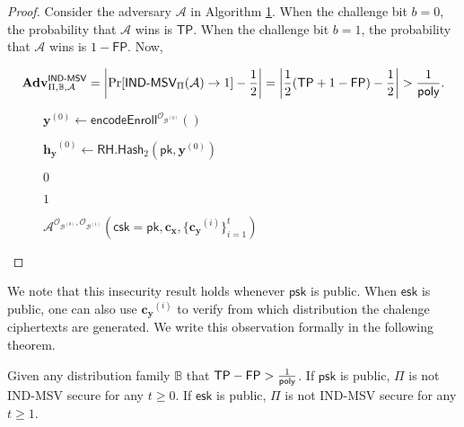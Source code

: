 \begin{proof}

Consider the adversary $\mathcal{A}$ in Algorithm \ref{alg:rh:ind}. When the challenge bit $b = 0$, the probability that $\mathcal{A}$ wins is $\textsf{TP}$. When the challenge bit $b = 1$, the probability that $\mathcal{A}$ wins is $1 - \textsf{FP}$. Now, 

\[
	\mathbf{Adv}_{\Pi, \mathbb{B}, \mathcal{A}}^{\textsf{IND-MSV}} = \left| \Pr[ \textsf{IND-MSV}_\Pi(\mathcal{A}) \to 1 ] - \frac{1}{2} \right| = \left| \frac{1}{2} (\textsf{TP} + 1 - \textsf{FP}) - \frac{1}{2} \right| > \frac{1}{\mathsf{poly}}.
\]

\begin{figure}[h]
\centering

	\begin{minipage}[t]{0.7\textwidth}
	\begin{algorithm}[H]
	\caption{$\mathcal{A}^{\mathcal{O}_{\mathcal{B}^{(0)}}, \mathcal{O}_{\mathcal{B}^{(1)}}} ( \textsf{csk} = \textsf{pk}, \mathbf{c_x}, \{ \mathbf{c_y}^{(i)} \}_{i=1}^t )$}
	\label{alg:rh:ind}
	\begin{algorithmic}[1]

		\State $\mathbf{y}^{(0)} \gets \textsf{encodeEnroll}^{\mathcal{O}_{\mathcal{B}^{(0)}}}()$
		
		\State $\mathbf{h_y}^{(0)} \gets \textsf{RH.Hash}_2(\textsf{pk}, \mathbf{y}^{(0)})$
		
		
			\State \Return $0$
		
		\Else
			
			\State \Return $1$
		
		\EndIf
	\end{algorithmic}
	\end{algorithm}
	\end{minipage}

\end{figure}

\end{proof}

We note that this insecurity result holds whenever $\textsf{psk}$ is public. When $\textsf{esk}$ is public, one can also use $\mathbf{c_y}^{(i)}$ to verify from which distribution the chalenge ciphertexts are generated. We write this observation formally in the following theorem.

\begin{theorem}

Given any distribution family $\mathbb{B}$ that $\textsf{TP} - \textsf{FP} > \frac{1}{\mathsf{poly}}$. If $\textsf{psk}$ is public, $\Pi$ is not IND-MSV secure for any $t \geq 0$. If $\textsf{esk}$ is public, $\Pi$ is not IND-MSV secure for any $t \geq 1$.

\end{theorem}



